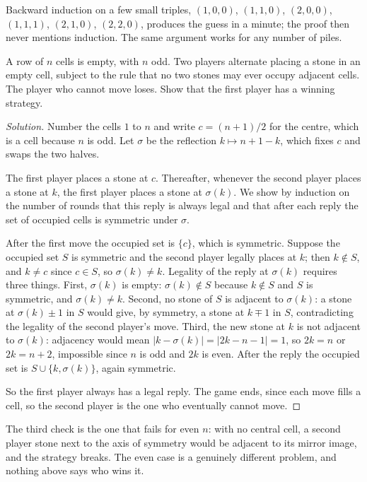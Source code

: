 Backward induction on a few small triples, $(1,0,0)$, $(1,1,0)$, $(2,0,0)$, $(1,1,1)$, $(2,1,0)$, $(2,2,0)$, produces the guess in a minute; the proof then never mentions induction. The same argument works for any number of piles.

\begin{example}
A row of $n$ cells is empty, with $n$ odd. Two players alternate placing a stone in an empty cell, subject to the rule that no two stones may ever occupy adjacent cells. The player who cannot move loses. Show that the first player has a winning strategy.
\end{example}

\begin{proof}[Solution]
Number the cells $1$ to $n$ and write $c = (n+1)/2$ for the centre, which is a cell because $n$ is odd. Let $\sigma$ be the reflection $k \mapsto n + 1 - k$, which fixes $c$ and swaps the two halves.

The first player places a stone at $c$. Thereafter, whenever the second player places a stone at $k$, the first player places a stone at $\sigma(k)$. We show by induction on the number of rounds that this reply is always legal and that after each reply the set of occupied cells is symmetric under $\sigma$.

After the first move the occupied set is $\{c\}$, which is symmetric. Suppose the occupied set $S$ is symmetric and the second player legally places at $k$; then $k \notin S$, and $k \ne c$ since $c \in S$, so $\sigma(k) \ne k$. Legality of the reply at $\sigma(k)$ requires three things. First, $\sigma(k)$ is empty: $\sigma(k) \notin S$ because $k \notin S$ and $S$ is symmetric, and $\sigma(k) \ne k$. Second, no stone of $S$ is adjacent to $\sigma(k)$: a stone at $\sigma(k) \pm 1$ in $S$ would give, by symmetry, a stone at $k \mp 1$ in $S$, contradicting the legality of the second player's move. Third, the new stone at $k$ is not adjacent to $\sigma(k)$: adjacency would mean $|k - \sigma(k)| = |2k - n - 1| = 1$, so $2k = n$ or $2k = n + 2$, impossible since $n$ is odd and $2k$ is even. After the reply the occupied set is $S \cup \{k, \sigma(k)\}$, again symmetric.

So the first player always has a legal reply. The game ends, since each move fills a cell, so the second player is the one who eventually cannot move.
\end{proof}

The third check is the one that fails for even $n$: with no central cell, a second player stone next to the axis of symmetry would be adjacent to its mirror image, and the strategy breaks. The even case is a genuinely different problem, and nothing above says who wins it.


